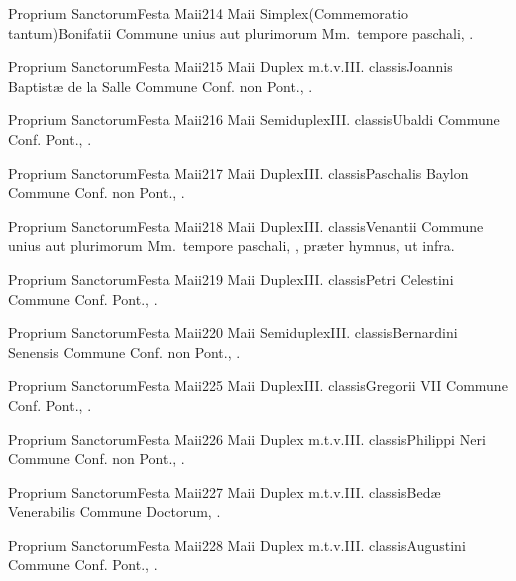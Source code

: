 \documentclass[nocturnale-romanum.tex]{subfiles}
\begin{document}
	{Proprium Sanctorum}{Festa Maii}{2}{14 Maii}
	{Simplex}{(Commemoratio tantum)}{Bonifatii}
	{Commune unius aut plurimorum Mm.\ tempore paschali, \pageref{M-MRTP}.}
	{}

	{Proprium Sanctorum}{Festa Maii}{2}{15 Maii}
	{Duplex m.t.v.}{III. classis}{Joannis Baptistæ de la Salle}
	{Commune Conf. non Pont., \pageref{M-CONP}.}
	{}

	{Proprium Sanctorum}{Festa Maii}{2}{16 Maii}
	{Semiduplex}{III. classis}{Ubaldi}
	{Commune Conf. Pont., \pageref{M-COPO}.}
	{}

	{Proprium Sanctorum}{Festa Maii}{2}{17 Maii}
	{Duplex}{III. classis}{Paschalis Baylon}
	{Commune Conf. non Pont., \pageref{M-CONP}.}
	{}

	{Proprium Sanctorum}{Festa Maii}{2}{18 Maii}
	{Duplex}{III. classis}{Venantii}
	{Commune unius aut plurimorum Mm.\ tempore paschali, \pageref{M-MRTP}, præter hymnus, ut infra.}
	{}

	{Proprium Sanctorum}{Festa Maii}{2}{19 Maii}
	{Duplex}{III. classis}{Petri Celestini}
	{Commune Conf. Pont., \pageref{M-COPO}.}
	{}

	{Proprium Sanctorum}{Festa Maii}{2}{20 Maii}
	{Semiduplex}{III. classis}{Bernardini Senensis}
	{Commune Conf. non Pont., \pageref{M-CONP}.}
	{}

	{Proprium Sanctorum}{Festa Maii}{2}{25 Maii}
	{Duplex}{III. classis}{Gregorii VII}
	{Commune Conf. Pont., \pageref{M-COPO}.}
	{}

	{Proprium Sanctorum}{Festa Maii}{2}{26 Maii}
	{Duplex m.t.v.}{III. classis}{Philippi Neri}
	{Commune Conf. non Pont., \pageref{M-CONP}.}
	{}

	{Proprium Sanctorum}{Festa Maii}{2}{27 Maii}
	{Duplex m.t.v.}{III. classis}{Bedæ Venerabilis}
	{Commune Doctorum, \pageref{M-CODO}.}
	{}

	{Proprium Sanctorum}{Festa Maii}{2}{28 Maii}
	{Duplex m.t.v.}{III. classis}{Augustini}
	{Commune Conf. Pont., \pageref{M-COPO}.}
	{}
\end{document}
